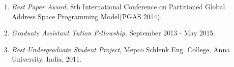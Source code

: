 \begin{enumerate}
\setcounter{enumi}{0}
\item \textit{Best Paper Award}, 8th International Conference on Partitioned
    Global Address Space Programming Model(PGAS 2014).
\item \textit{Graduate Assistant Tution Fellowship}, September 2013 - May 2015.
\item \textit{Best Undergraduate Student Project}, Mepco Schlenk Eng. College,
    Anna University, India, 2011.\\
\end{enumerate}
